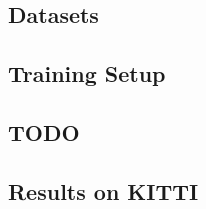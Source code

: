 
\subsection{Datasets}

\subsection{Training Setup}

\subsection{TODO}

\subsection{Results on KITTI}
